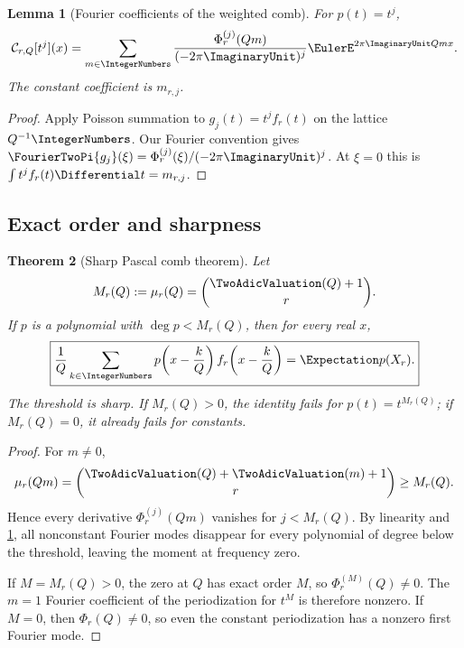 \documentclass[11pt,oneside]{article}
\newtheorem{theorem}{Theorem}[section]
\newtheorem{lemma}[theorem]{Lemma}
\theoremstyle{definition}
\theoremstyle{remark}
\begin{document}
\begin{lemma}[Fourier coefficients of the weighted comb]\label{lem:comb-Fourier}
For $p(t)=t^j$,
\begin{equation}\label{eq:comb-Fourier}
 \mathcal C_{r,Q}[t^j](x)
 =\sum_{m\in\IntegerNumbers}
 \frac{\Phi_r^{(j)}(Qm)}{(-2\pi\ImaginaryUnit)^j}
 \EulerE^{2\pi\ImaginaryUnit Qmx}.
\end{equation}
The constant coefficient is $m_{r,j}$.
\end{lemma}

\begin{proof}
Apply Poisson summation to $g_j(t)=t^jf_r(t)$ on the lattice $Q^{-1}\IntegerNumbers$.
Our Fourier convention gives
$\FourierTwoPi{g_j}(\xi)=\Phi_r^{(j)}(\xi)/(-2\pi\ImaginaryUnit)^j$.
At $\xi=0$ this is $\int t^jf_r(t)\Differential t=m_{r,j}$.
\end{proof}

\subsection{Exact order and sharpness}

\begin{theorem}[Sharp Pascal comb theorem]\label{thm:sharp-comb}
Let
\begin{equation}\label{eq:M-rQ}
 M_r(Q):=\mu_r(Q)=\binom{\TwoAdicValuation(Q)+1}{r}.
\end{equation}
If $p$ is a polynomial with $\deg p<M_r(Q)$, then for every real $x$,
\begin{equation}\label{eq:comb-exact}
 \boxed{
 \frac1Q\sum_{k\in\IntegerNumbers}p\!\left(x-\frac{k}{Q}\right)
 f_r\!\left(x-\frac{k}{Q}\right)=\Expectation p(X_r).}
\end{equation}
The threshold is sharp.  If $M_r(Q)>0$, the identity fails for
$p(t)=t^{M_r(Q)}$; if $M_r(Q)=0$, it already fails for constants.
\end{theorem}

\begin{proof}
For $m\neq0$,
\[
 \mu_r(Qm)=\binom{\TwoAdicValuation(Q)+\TwoAdicValuation(m)+1}{r}\geq M_r(Q).
\]
Hence every derivative $\Phi_r^{(j)}(Qm)$ vanishes for $j<M_r(Q)$.  By
linearity and \cref{lem:comb-Fourier}, all nonconstant Fourier modes disappear
for every polynomial of degree below the threshold, leaving the moment at
frequency zero.

If $M=M_r(Q)>0$, the zero at $Q$ has exact order $M$, so
$\Phi_r^{(M)}(Q)\neq0$.  The $m=1$ Fourier coefficient of the periodization for
$t^M$ is therefore nonzero.  If $M=0$, then $\Phi_r(Q)\neq0$, so even the
constant periodization has a nonzero first Fourier mode.
\end{proof}
\end{document}
